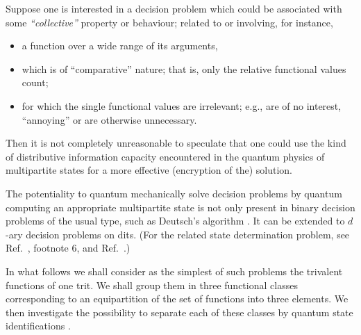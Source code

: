 \documentclass[fleqn,twoside]{article}
\begin{document}
Suppose one is interested in a decision problem which could be associated with some {\em ``collective''} property or behaviour;
related to or involving, for instance,
\begin{itemize}
\item
a function over a wide range of its arguments,
\item
which is of ``comparative'' nature; that is, only the relative functional values count;
\item
for which the single functional values are irrelevant;
e.g., are of no interest, ``annoying'' or are otherwise unnecessary.
\end{itemize}
Then it is not completely unreasonable to speculate that one could use the
kind of distributive  information capacity encountered in the quantum physics of multipartite states
for a more effective (encryption of the) solution.

The potentiality to quantum mechanically solve decision problems
by quantum computing an appropriate multipartite state is not only present in binary decision problems of the usual type,
such as Deutsch's algorithm \cite{deutsch,deutsch:92,cleve:98,nielsen-book,mermin-07}.
It can be extended to $d$-ary decision problems on dits. (For the related state determination problem,
see  Ref.~\cite{zeil-99}, footnote 6,
and Ref.~\cite{svozil-2002-statepart-prl}.)


In what follows we shall consider as the simplest of such problems
the trivalent functions of one trit.
We shall group them in three functional classes
corresponding to an equipartition of the set of functions into three elements.
We then investigate
the possibility to separate each of these classes by
quantum state identifications \cite{DonSvo01,svozil-2002-statepart-prl}.
\end{document}
